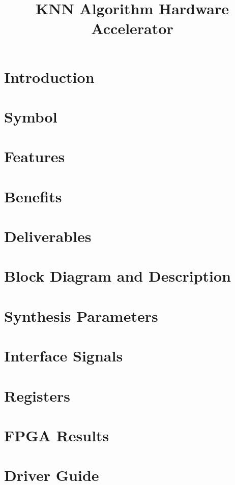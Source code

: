 \documentclass{../../submodules/TEX/document/ug/ug}
\title{KNN Algorithm Hardware Accelerator}
\begin{document}
\maketitle
\cleardoublepage
\tableofcontents
\listoftables
\listoffigures
\cleardoublepage

\section{Introduction}


\section{Symbol}


\section{\textcolor[rgb]{0,0,0}{Features}}

\clearpage

\section{\textcolor[rgb]{0,0,0}{Benefits}}


\section{\textcolor[rgb]{0,0,0}{Deliverables}}

\clearpage

\section{\textcolor[rgb]{0,0,0}{Block Diagram and Description}}

\clearpage

\section{\textcolor[rgb]{0,0,0}{Synthesis Parameters}}


\section{Interface Signals}


\section{Registers}


\section{\textcolor[rgb]{0,0,0}{FPGA Results}}


\section{Driver Guide}


%
%
\end{document}
